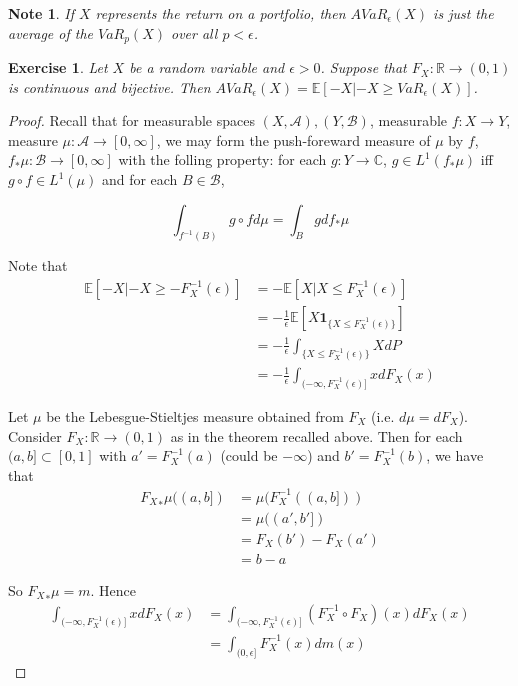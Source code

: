 \documentclass[12pt]{amsart}
\newtheorem{note}[thm]{Note}
\newtheorem{ex}[thm]{Exercise}
\newcommand{\ep}{\epsilon}
\newcommand{\C}{\mathbb{C}}
\newcommand{\E}{\mathbb{E}}
\newcommand{\R}{\mathbb{R}}
\newcommand{\MA}{\mathcal{A}}
\newcommand{\MB}{\mathcal{B}}
\newcommand{\RG}{[0,\infty]}
\begin{document}
\begin{note}
If $X$ represents the return on a portfolio, then $AVaR_{\ep}(X)$ is just the average of the $VaR_{p}(X)$ over all $p< \ep$.
\end{note}

\begin{ex}
Let $X$ be a random variable and $\ep > 0$. Suppose that $F_X: \R \rightarrow (0,1)$ is continuous and bijective. Then $AVaR_{\ep}(X) = \E[-X|-X \geq VaR_{\ep}(X)]$.
\end{ex}

\begin{proof}
Recall that for measurable spaces $(X,\MA), (Y, \MB)$, measurable $f:X \rightarrow Y$, measure $\mu:\MA \rightarrow \RG$, we may form the push-foreward measure of $\mu$ by $f$, $f_{*}\mu:\MB \rightarrow \RG$ with the folling property: for each $g:Y \rightarrow \C$, $g \in L^1(f_* \mu)$ iff  $g \circ f \in L^1(\mu)$ and for each $B \in \MB$, 

$$\int_{f^{-1}(B)}g \circ f d\mu = \int_B g d f_*\mu$$

Note that 
\begin{align*}
\E[-X|-X \geq -F^{-1}_X(\ep)] 
&= -\E[X|X \leq F^{-1}_X(\ep)] \\ 
&= -\frac{1}{\ep}\E [X\mathbf{1}_{\{X \leq F^{-1}_X(\ep)\}}] \\ 
&= - \frac{1}{\ep} \int_{\{X \leq F_X^{-1}(\ep)\}}XdP \\
& = -\frac{1}{\ep} \int_{(-\infty, F_X^{-1}(\ep)]}xd F_X(x)
\end{align*}

Let $\mu$ be the Lebesgue-Stieltjes measure obtained from $F_X$ (i.e. $d \mu = dF_X$). Consider $F_X: \R \rightarrow (0,1)$ as in the theorem recalled above. Then for each $(a,b] \subset [0,1]$ with $a' =  F_X^{-1}(a)$ (could be $-\infty$) and $b' = F_X^{-1}(b)$, we have that 
\begin{align*}
{F_X}_{*} \mu ((a,b]) 
&= \mu(F^{-1}_X((a,b]))\\
&= \mu((a', b']) \\ 
&= F_X(b') - F_X(a')\\
&= b-a
\end{align*}

So ${F_X}_{*} \mu = m$. Hence  
\begin{align*}
\int_{(-\infty, F_X^{-1}(\ep)]}xd F_X(x) 
&= \int_{(-\infty, F_X^{-1}(\ep)]}(F^{-1}_X \circ F_X) (x)d F_X(x) \\
&= \int_{(0,\ep]} F^{-1}_X(x)dm(x)
\end{align*}
\end{proof}
\end{document}
